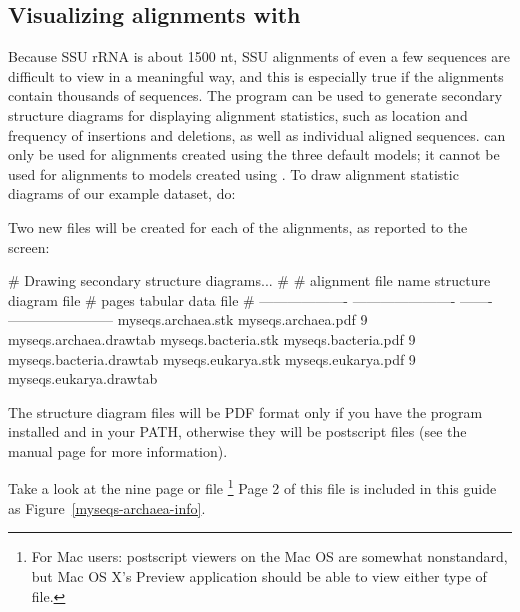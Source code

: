 \subsection{Visualizing alignments with }

Because SSU rRNA is about 1500 nt, SSU alignments of even a few
sequences are difficult to view in a meaningful way, and this is
especially true if the alignments contain thousands of sequences.
The  program can be used to generate secondary
structure diagrams for displaying alignment statistics, such as
location and frequency of insertions and deletions, as well as
individual aligned sequences.  can only be used for
alignments created using the three default models; it cannot
be used for alignments to models created using .
To draw alignment statistic diagrams of our  example
dataset, do:


Two new files will be created for each of the alignments, as reported
to the screen:

\begin{sreoutput}
# Drawing secondary structure diagrams...
#
# alignment file name  structure diagram file  # pages  tabular data file      
# -------------------  ----------------------  -------  -----------------------
  myseqs.archaea.stk   myseqs.archaea.pdf            9  myseqs.archaea.drawtab 
  myseqs.bacteria.stk  myseqs.bacteria.pdf           9  myseqs.bacteria.drawtab
  myseqs.eukarya.stk   myseqs.eukarya.pdf            9  myseqs.eukarya.drawtab 
\end{sreoutput}

The structure diagram files will be PDF format only if you have the
program  installed and in your PATH, otherwise they will
be postscript files (see the  manual page for more
information). 

Take a look at the nine page  or
 file \footnote{For Mac users: postscript
  viewers on the Mac OS are somewhat nonstandard, but Mac OS X's
  Preview application should be able to view either type of file.}
Page 2 of this file is included in this
guide as Figure~\ref{myseqs-archaea-info}. 

